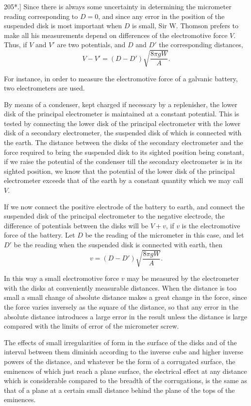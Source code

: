 \documentclass[12pt,oneside]{book}[2021/10/04]
\newcommand{\Runhead}[1]{\fancyhead[C]{\iffloatpage{}{\small#1}}}
\newcommand{\article}[1]{\phantomsection \label{art:#1}{#1.]}}
\newcommand{\¬}{\hphantom{0}}
\begin{document}
\article{205*} Since there is always some uncertainty in determining the
micrometer reading corresponding to \(D = 0\), and since any error
in the position of the suspended disk is most important when \(D\)
is small, Sir W. Thomson prefers to make all his measurements
depend on differences of the electromotive force \(V\). Thus, if \(V\) and
\(V'\) are two potentials, and \(D\) and \(D'\) the corresponding distances,
\[
  V - V' = (D - D') \sqrt{ \frac{8 \pi g W}{A}}\text{.}
\]

For instance, in order to measure the electromotive force of a
galvanic battery, two electrometers are used.

By means of a condenser, kept charged if necessary by a replenisher,
the lower disk of the principal electrometer is maintained
at a constant potential. This is tested by connecting the lower
disk of the principal electrometer with the lower disk of a secondary
electrometer, the suspended disk of which is connected with the
earth. The distance between the disks of the secondary electrometer
and the force required to bring the suspended disk to
its sighted position being constant, if we raise the potential of the
condenser till the secondary electrometer is in its sighted position,
we know that the potential of the lower disk of the principal
electrometer exceeds that of the earth by a constant quantity which
we may call \(V\).

If we now connect the positive electrode of the battery to earth,
and connect the suspended disk of the principal electrometer to the
negative electrode, the difference of potentials between the disks
will be \(V + v\), if \(v\) is the electromotive force of the battery. Let
\(D\) be the reading of the micrometer in this case, and let \(D'\) be the
reading when the suspended disk is connected with earth, then
\[
 v = (D - D') \sqrt{ \frac{8 \pi gW}{A}}\text{.}
\]

In this way a small electromotive force \(v\) may be measured
by the electrometer with the disks at conveniently measurable
distances. When the distance is too small a small change of
absolute distance makes a great change in the force, since the
force varies inversely as the square of the distance, so that any
error in the absolute distance introduces a large error in the result
unless the distance is large compared with the limits of error of
the micrometer screw.
\Runhead{SMALL ELECTROMOTIVE FORCES MEASURED.}

The effects of small irregularities of form in the surface of the
disks and of the interval between them diminish according to the
inverse cube and higher inverse powers of the distance, and whatever
be the form of a corrugated surface, the eminences of which
just reach a plane surface, the electrical effect at any distance
which is considerable compared to the breadth of the corrugations,
is the same as that of a plane at a certain small distance behind
the plane of the tops of the eminences.
\end{document}
